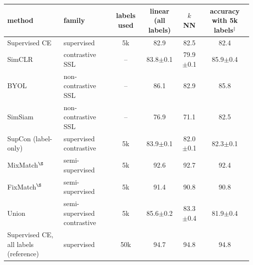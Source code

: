 \begin{tabular}{l l c ccc}
\toprule
method & family & labels used & linear (all labels) & $k$NN & accuracy with 5k labels$^\ddagger$ \\
\midrule
Supervised CE & supervised & 5k & 82.9 & 82.5 & 82.4 \\
SimCLR & contrastive SSL & -- & 83.8{\scriptsize$\pm$0.1} & 79.9{\scriptsize$\pm$0.1} & 85.9{\scriptsize$\pm$0.4} \\
BYOL & non-contrastive SSL & -- & 86.1 & 82.9 & 85.8 \\
SimSiam & non-contrastive SSL & -- & 76.9 & 71.1 & 82.5 \\
SupCon (label-only) & supervised contrastive & 5k & 83.9{\scriptsize$\pm$0.1} & 82.0{\scriptsize$\pm$0.1} & 82.3{\scriptsize$\pm$0.1} \\
MixMatch$^\S$ & semi-supervised & 5k & 92.6 & 92.7 & 92.4 \\
FixMatch$^\S$ & semi-supervised & 5k & 91.4 & 90.8 & 90.8 \\
Union & semi-supervised contrastive & 5k & 85.6{\scriptsize$\pm$0.2} & 83.3{\scriptsize$\pm$0.4} & 81.9{\scriptsize$\pm$0.4} \\
Supervised CE, all labels (reference) & supervised & 50k & 94.7 & 94.8 & 94.8 \\
\bottomrule
\end{tabular}
